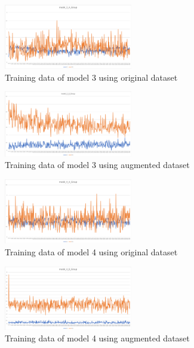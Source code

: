 \documentclass{ijisa}
\begin{document}
\begin{figure}[h]
\includegraphics[width=0.5\textwidth]{charts/3A.png}
\caption{Training data of model 3 using original dataset}
\end{figure}


\begin{figure}[h]
\includegraphics[width=0.5\textwidth]{charts/3B.png}
\caption{Training data of model 3 using augmented dataset}
\end{figure}

\begin{figure}[h]
\includegraphics[width=0.5\textwidth]{charts/4A.png}
\caption{Training data of model 4 using original dataset}
\end{figure}


\begin{figure}[h]
\includegraphics[width=0.5\textwidth]{charts/4B.png}
\caption{Training data of model 4 using augmented dataset}
\end{figure}
\end{document}
